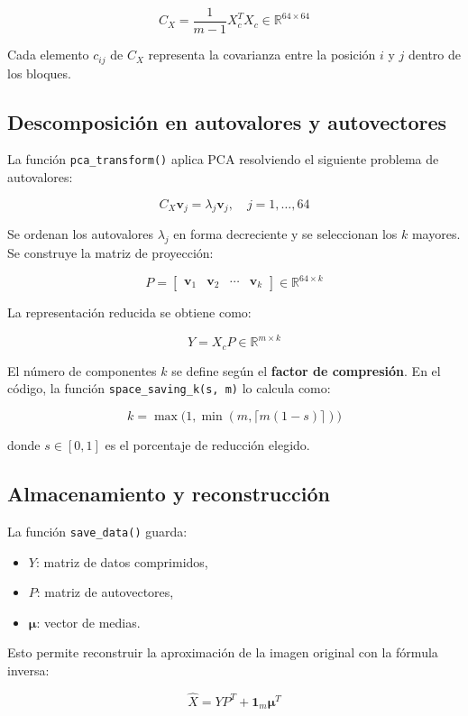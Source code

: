 \documentclass[a4paper,12pt]{article}
\numberwithin{equation}{section}
\numberwithin{figure}{section}
\begin{document}
\[
C_X = \frac{1}{m-1} X_c^T X_c \in \mathbb{R}^{64 \times 64}
\]

Cada elemento \(c_{ij}\) de \(C_X\) representa la covarianza entre la posición \(i\) y \(j\) dentro de los bloques.

\subsection*{Descomposición en autovalores y autovectores}

La función \texttt{pca\_transform()} aplica PCA resolviendo el siguiente problema de autovalores:

\[
C_X \mathbf{v}_j = \lambda_j \mathbf{v}_j, \quad j = 1, \dots, 64
\]

Se ordenan los autovalores \(\lambda_j\) en forma decreciente y se seleccionan los \(k\) mayores. Se construye la matriz de proyección:

\[
P = \begin{bmatrix} \mathbf{v}_1 & \mathbf{v}_2 & \cdots & \mathbf{v}_k \end{bmatrix} \in \mathbb{R}^{64 \times k}
\]

La representación reducida se obtiene como:

\[
Y = X_c P \in \mathbb{R}^{m \times k}
\]

El número de componentes \(k\) se define según el \textbf{factor de compresión}. En el código, la función \texttt{space\_saving\_k(s, m)} lo calcula como:

\[
k = \max\big(1, \min(m, \lceil m(1-s) \rceil)\big)
\]

donde \(s \in [0,1]\) es el porcentaje de reducción elegido.

\subsection*{Almacenamiento y reconstrucción}

La función \texttt{save\_data()} guarda:
\begin{itemize}
    \item \(Y\): matriz de datos comprimidos,
    \item \(P\): matriz de autovectores,
    \item \(\boldsymbol{\mu}\): vector de medias.
\end{itemize}

Esto permite reconstruir la aproximación de la imagen original con la fórmula inversa:

\[
\hat{X} = Y P^T + \mathbf{1}_m \boldsymbol{\mu}^T
\]
\end{document}
